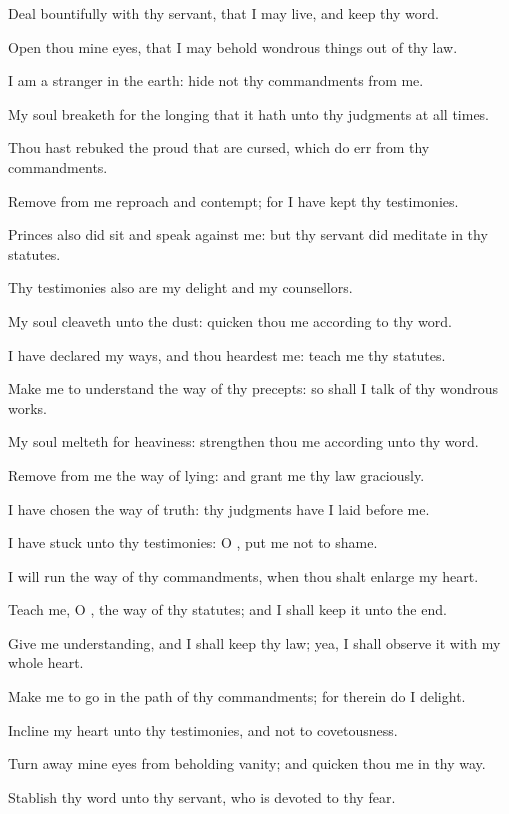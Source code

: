 \verse Deal bountifully with thy servant, that I may live, and keep thy word.

\verse Open thou mine eyes, that I may behold wondrous things out of thy law.

\verse I am a stranger in the earth: hide not thy commandments from me.

\verse My soul breaketh for the longing that it hath unto thy judgments at all times.

\verse Thou hast rebuked the proud that are cursed, which do err from thy commandments.

\verse Remove from me reproach and contempt; for I have kept thy testimonies.

\verse Princes also did sit and speak against me: but thy servant did meditate in thy statutes.

\verse Thy testimonies also are my delight and my counsellors.

\verse My soul cleaveth unto the dust: quicken thou me according to thy word.

\verse I have declared my ways, and thou heardest me: teach me thy statutes.

\verse Make me to understand the way of thy precepts: so shall I talk of thy wondrous works.

\verse My soul melteth for heaviness: strengthen thou me according unto thy word.

\verse Remove from me the way of lying: and grant me thy law graciously.

\verse I have chosen the way of truth: thy judgments have I laid before me.

\verse I have stuck unto thy testimonies: O \LORD, put me not to shame.

\verse I will run the way of thy commandments, when thou shalt enlarge my heart.

\verse Teach me, O \LORD, the way of thy statutes; and I shall keep it unto the end.

\verse Give me understanding, and I shall keep thy law; yea, I shall observe it with my whole heart.

\verse Make me to go in the path of thy commandments; for therein do I delight.

\verse Incline my heart unto thy testimonies, and not to covetousness.

\verse Turn away mine eyes from beholding vanity; and quicken thou me in thy way.

\verse Stablish thy word unto thy servant, who is devoted to thy fear.

